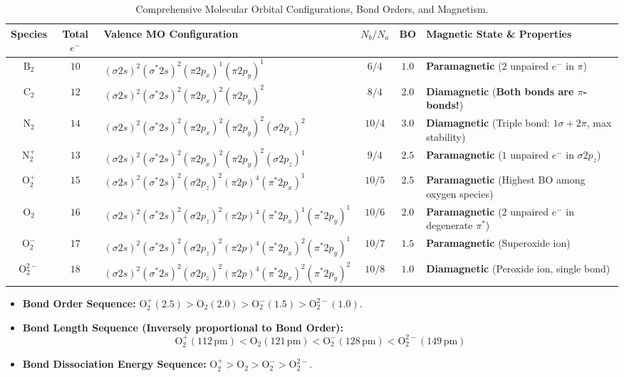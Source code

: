 \documentclass[10pt,a4paper]{article}
\begin{document}
\begin{table}[htbp]
\centering
\footnotesize
\renewcommand{\arraystretch}{1.25}
\begin{tabularx}{\textwidth}{c c p{6.8cm} c c L}
\toprule
\textbf{Species} & \textbf{Total $e^-$} & \textbf{Valence MO Configuration} & $N_b / N_a$ & \textbf{BO} & \textbf{Magnetic State \& Properties} \\
\midrule
$\mathrm{B_2}$ & $10$ & $(\sigma 2s)^2 (\sigma^* 2s)^2 (\pi 2p_x)^1 (\pi 2p_y)^1$ & $6 / 4$ & $1.0$ & \textbf{Paramagnetic} ($2$ unpaired $e^-$ in $\pi$) \\
$\mathrm{C_2}$ & $12$ & $(\sigma 2s)^2 (\sigma^* 2s)^2 (\pi 2p_x)^2 (\pi 2p_y)^2$ & $8 / 4$ & $2.0$ & \textbf{Diamagnetic} (\textbf{Both bonds are $\pi$-bonds!}) \\
$\mathrm{N_2}$ & $14$ & $(\sigma 2s)^2 (\sigma^* 2s)^2 (\pi 2p_x)^2 (\pi 2p_y)^2 (\sigma 2p_z)^2$ & $10 / 4$ & $3.0$ & \textbf{Diamagnetic} (Triple bond: $1\sigma + 2\pi$, max stability) \\
$\mathrm{N_2^+}$ & $13$ & $(\sigma 2s)^2 (\sigma^* 2s)^2 (\pi 2p_x)^2 (\pi 2p_y)^2 (\sigma 2p_z)^1$ & $9 / 4$ & $2.5$ & \textbf{Paramagnetic} ($1$ unpaired $e^-$ in $\sigma 2p_z$) \\
$\mathrm{O_2^+}$ & $15$ & $(\sigma 2s)^2 (\sigma^* 2s)^2 (\sigma 2p_z)^2 (\pi 2p)^4 (\pi^* 2p_x)^1$ & $10 / 5$ & $2.5$ & \textbf{Paramagnetic} (Highest BO among oxygen species) \\
$\mathrm{O_2}$ & $16$ & $(\sigma 2s)^2 (\sigma^* 2s)^2 (\sigma 2p_z)^2 (\pi 2p)^4 (\pi^* 2p_x)^1 (\pi^* 2p_y)^1$ & $10 / 6$ & $2.0$ & \textbf{Paramagnetic} ($2$ unpaired $e^-$ in degenerate $\pi^*$) \\
$\mathrm{O_2^-}$ & $17$ & $(\sigma 2s)^2 (\sigma^* 2s)^2 (\sigma 2p_z)^2 (\pi 2p)^4 (\pi^* 2p_x)^2 (\pi^* 2p_y)^1$ & $10 / 7$ & $1.5$ & \textbf{Paramagnetic} (Superoxide ion) \\
$\mathrm{O_2^{2-}}$ & $18$ & $(\sigma 2s)^2 (\sigma^* 2s)^2 (\sigma 2p_z)^2 (\pi 2p)^4 (\pi^* 2p_x)^2 (\pi^* 2p_y)^2$ & $10 / 8$ & $1.0$ & \textbf{Diamagnetic} (Peroxide ion, single bond) \\
\bottomrule
\end{tabularx}
\caption{Comprehensive Molecular Orbital Configurations, Bond Orders, and Magnetism.}
\end{table}

\begin{ncertbox}
\begin{itemize}
  \item \textbf{Bond Order Sequence:} $\mathrm{O_2^+ (2.5) > O_2 (2.0) > O_2^- (1.5) > O_2^{2-} (1.0)}$.
  \item \textbf{Bond Length Sequence (Inversely proportional to Bond Order):}
  \begin{equation}
    \mathbf{\mathrm{O_2^+ (112\,pm) < O_2 (121\,pm) < O_2^- (128\,pm) < O_2^{2-} (149\,pm)}}
  \end{equation}
  \item \textbf{Bond Dissociation Energy Sequence:} $\mathrm{O_2^+ > O_2 > O_2^- > O_2^{2-}}$.
\end{itemize}
\end{ncertbox}
\end{document}
